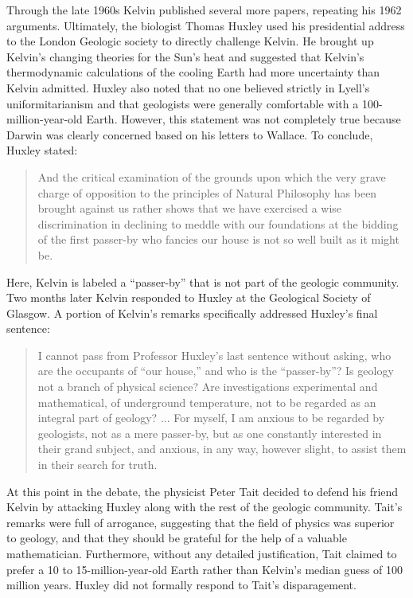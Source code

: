 \documentclass[12pt]{article}
\begin{document}
Through the late 1960s Kelvin published several more papers, repeating his 1962 arguments. Ultimately, the biologist Thomas Huxley used his presidential address to the London Geologic society to directly challenge Kelvin. He brought up Kelvin's changing theories for the Sun's heat and suggested that Kelvin's thermodynamic calculations of the cooling Earth had more uncertainty than Kelvin admitted. Huxley also noted that no one believed strictly in Lyell's uniformitarianism and that geologists were generally comfortable with a 100-million-year-old Earth. However, this statement was not completely true because Darwin was clearly concerned based on his letters to Wallace. To conclude, Huxley stated: 

\begin{quote}
  And the critical examination of the grounds upon which the very grave charge of opposition to the principles of Natural Philosophy has been brought against us rather shows that we have exercised a wise discrimination in declining to meddle with our foundations at the bidding of the first passer-by who fancies our house is not so well built as it might be.
\end{quote}
Here, Kelvin is labeled a ``passer-by'' that is not part of the geologic community. Two months later Kelvin responded to Huxley at the Geological Society of Glasgow. A portion of Kelvin's remarks specifically addressed Huxley's final sentence:

\begin{quote}
  I cannot pass from Professor Huxley's last sentence without asking, who are the occupants of ``our house,'' and who is the ``passer-by''? Is geology not a branch of physical science? Are investigations experimental and mathematical, of underground temperature, not to be regarded as an integral part of geology? ... For myself, I am anxious to be regarded by geologists, not as a mere passer-by, but as one constantly interested in their grand subject, and anxious, in any way, however slight, to assist them in their search for truth.
\end{quote}

At this point in the debate, the physicist Peter Tait decided to defend his friend Kelvin by attacking Huxley along with the rest of the geologic community. Tait's remarks were full of arrogance, suggesting that the field of physics was superior to geology, and that they should be grateful for the help of a valuable mathematician. Furthermore, without any detailed justification, Tait claimed to prefer a 10 to 15-million-year-old Earth rather than Kelvin's median guess of 100 million years. Huxley did not formally respond to Tait's disparagement.
\end{document}
